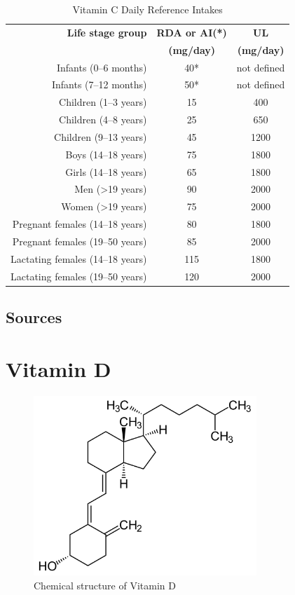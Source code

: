 \documentclass{book}
\begin{document}
\begin{sloppypar}
\begin{table}[ht]
	\caption{Vitamin C Daily Reference Intakes}
	\centering \begin{tabular}{| r | c | c |}
		\hline
		\textbf{Life stage group} & \textbf{RDA or AI(*)} & \textbf{UL}\\
		& \textbf{(mg/day)} & \textbf{(mg/day)}\\ \hline
		Infants (0--6 months) & 40* & not defined\\ \hline
		Infants (7--12 months) & 50* & not defined\\ \hline
		Children (1--3 years) & 15 & 400\\ \hline
		Children (4--8 years) & 25 & 650\\ \hline
		Children (9--13 years) & 45 & 1200\\ \hline
		Boys (14--18 years) & 75 & 1800\\ \hline
		Girls (14--18 years) & 65 & 1800\\ \hline
		Men (\textgreater19 years) & 90 & 2000\\ \hline
		Women (\textgreater19 years) & 75 & 2000\\ \hline
		Pregnant females (14--18 years) & 80 & 1800\\ \hline
		Pregnant females (19--50 years) & 85 & 2000\\ \hline
		Lactating females (14--18 years) & 115 & 1800\\ \hline
		Lactating females (19--50 years) & 120 & 2000\\ \hline
	\end{tabular}
\end{table}
\newpage


\section{Sources}


\chapter{Vitamin D}
\begin{figure}[h]
	\caption{Chemical structure of Vitamin D}
	\centering \includegraphics[width=0.75\textwidth]{images/Vitamin_D_chemical_structure}
\end{figure}
\newpage


\end{sloppypar}
\end{document}
